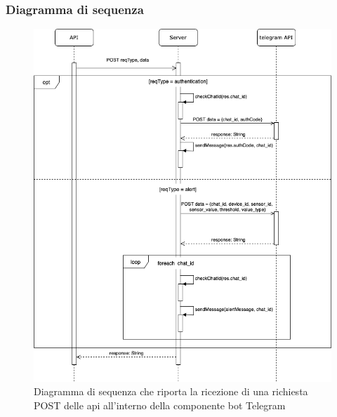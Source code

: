 \subsubsection{Diagramma di sequenza}
	\begin{figure}[H]
		\centering
		\includegraphics[scale=0.600]{res/images/BOTTELEGRAM/TelegramRichiestaPOST.png}
		\caption{Diagramma di sequenza che riporta la ricezione di una richiesta POST delle api all'interno della componente bot Telegram}
	\end{figure}
